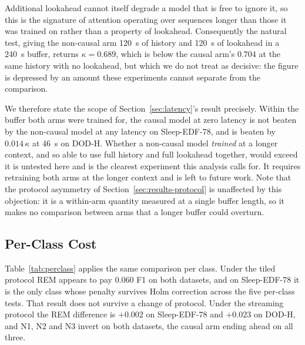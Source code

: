 \documentclass[conference]{IEEEtran}
\begin{document}
Additional lookahead cannot itself degrade a model that is free to ignore it, so this is the
signature of attention operating over sequences longer than those it was trained on rather than a
property of lookahead. Consequently the natural test, giving the non-causal arm 120~s of history and
120~s of lookahead in a 240~s buffer, returns $\kappa = 0.689$, which is below the causal arm's
$0.704$ at the same history with no lookahead, but which we do not treat as decisive: the figure is
depressed by an amount these experiments cannot separate from the comparison.

We therefore state the scope of Section~\ref{sec:latency}'s result precisely. Within the buffer both
arms were trained for, the causal model at zero latency is not beaten by the non-causal model at any
latency on Sleep-EDF-78, and is beaten by $0.014\,\kappa$ at 46~s on DOD-H. Whether a non-causal
model \emph{trained} at a longer context, and so able to use full history and full lookahead
together, would exceed it is untested here and is the clearest experiment this analysis calls for.
It requires retraining both arms at the longer context and is left to future work. Note that the
protocol asymmetry of Section~\ref{sec:results-protocol} is unaffected by this objection: it is a
within-arm quantity measured at a single buffer length, so it makes no comparison between arms that
a longer buffer could overturn.

\subsection{Per-Class Cost}
\label{sec:perclass}

Table~\ref{tab:perclass} applies the same comparison per class. Under the tiled protocol REM appears
to pay $0.060$ F1 on both datasets, and on Sleep-EDF-78 it is the only class whose penalty survives
Holm correction across the five per-class tests. That result does not survive a change of protocol.
Under the streaming protocol the REM difference is $+0.002$ on Sleep-EDF-78 and $+0.023$ on DOD-H,
and N1, N2 and N3 invert on both datasets, the causal arm ending ahead on all three.
\end{document}
